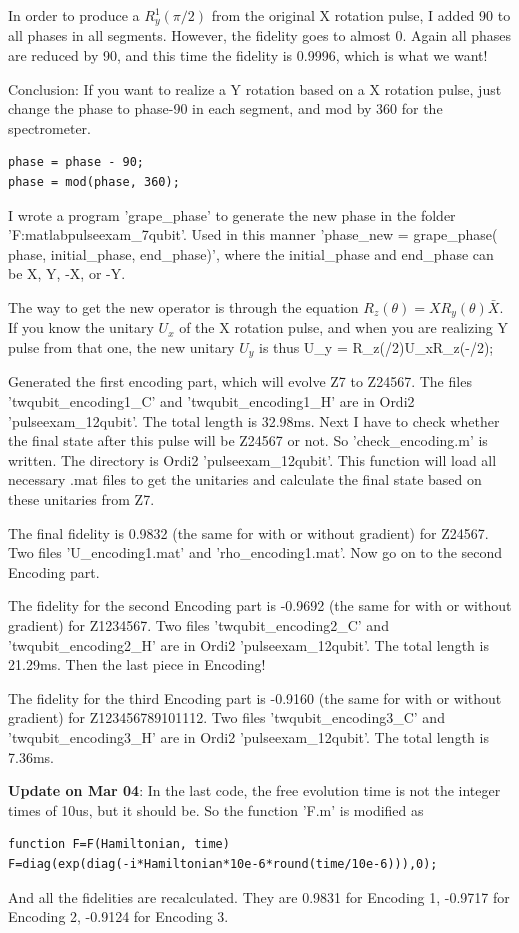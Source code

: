 In order to produce a $R_y^1(\pi/2)$ from the original X rotation pulse, I added 90 to all phases in all segments. However, the fidelity goes to almost 0. Again all phases are reduced by 90, and this time the fidelity is 0.9996, which is what we want!

Conclusion: If you want to realize a Y rotation based on a X rotation pulse, just change the phase to phase-90 in each segment, and mod by 360 for the spectrometer.
\begin{lstlisting}
phase = phase - 90;
phase = mod(phase, 360);
\end{lstlisting}
I wrote a program 'grape\_phase' to generate the new phase in the folder 'F:\dir matlab\dir pulseexam\_7qubit\dir'. Used in this manner  'phase\_new = grape\_phase( phase, initial\_phase, end\_phase)', where the initial\_phase and end\_phase can be X, Y, -X, or -Y.

The way to get the new operator is through the equation $R_z(\theta) = XR_y(\theta)\bar{X}$. If you know the unitary $U_x$ of the X rotation pulse, and when you are realizing Y pulse from that one, the new unitary $U_y$ is thus
\be
U_y = R_z(\pi/2)U_xR_z(-\pi/2);
\ee

Generated the first encoding part, which will evolve Z7 to Z24567. The files 'twqubit\_encoding1\_C' and 'twqubit\_encoding1\_H' are in Ordi2 '\dir pulseexam\_12qubit'. The total length is 32.98ms. Next I have to check whether the final state after this pulse will be Z24567 or not. So 'check\_encoding.m' is written. The directory is Ordi2 '\dir pulseexam\_12qubit'. This function will load all necessary .mat files to get the unitaries and calculate the final state based on these unitaries from Z7.

The final fidelity is 0.9832 (the same for with or without gradient) for Z24567. Two files 'U\_encoding1.mat' and 'rho\_encoding1.mat'. Now go on to the second Encoding part.

The fidelity for the second Encoding part is -0.9692 (the same for with or without gradient) for Z1234567. Two files 'twqubit\_encoding2\_C' and 'twqubit\_encoding2\_H' are in Ordi2 '\dir pulseexam\_12qubit'. The total length is 21.29ms. Then the last piece in Encoding!

The fidelity for the third Encoding part is -0.9160 (the same for with or without gradient) for Z123456789101112. Two files 'twqubit\_encoding3\_C' and 'twqubit\_encoding3\_H' are in Ordi2 '\dir pulseexam\_12qubit'. The total length is 7.36ms.

\textbf{Update on Mar 04}: In the last code, the free evolution time is not the integer times of 10us, but it should be. So the function 'F.m' is modified as
\begin{lstlisting}
function F=F(Hamiltonian, time)
F=diag(exp(diag(-i*Hamiltonian*10e-6*round(time/10e-6))),0);
\end{lstlisting}
And all the fidelities are recalculated. They are 0.9831 for Encoding 1,  -0.9717 for Encoding 2, -0.9124 for Encoding 3.

